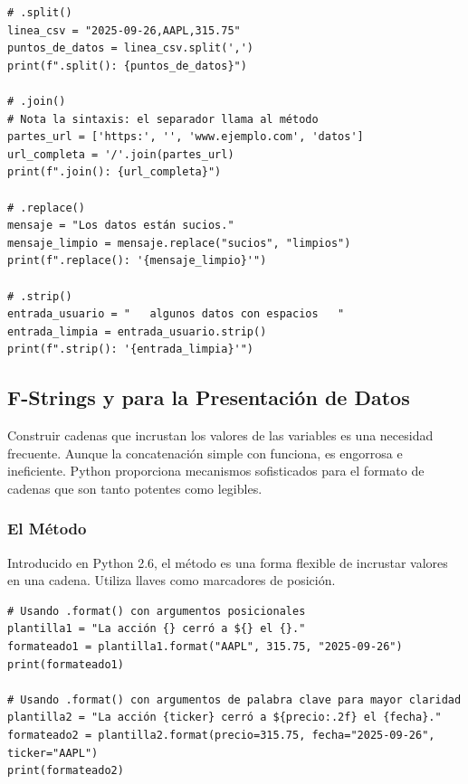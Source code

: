 \begin{example}\text{ }
\text{ }\begin{verbatim}
# .split()
linea_csv = "2025-09-26,AAPL,315.75"
puntos_de_datos = linea_csv.split(',')
print(f".split(): {puntos_de_datos}")

# .join()
# Nota la sintaxis: el separador llama al método
partes_url = ['https:', '', 'www.ejemplo.com', 'datos']
url_completa = '/'.join(partes_url)
print(f".join(): {url_completa}")

# .replace()
mensaje = "Los datos están sucios."
mensaje_limpio = mensaje.replace("sucios", "limpios")
print(f".replace(): '{mensaje_limpio}'")

# .strip()
entrada_usuario = "   algunos datos con espacios   "
entrada_limpia = entrada_usuario.strip()
print(f".strip(): '{entrada_limpia}'")
\end{verbatim}
\end{example}

\subsection{F-Strings y  para la Presentación de Datos}
\label{subsec:string_formatting}
Construir cadenas que incrustan los valores de las variables es una necesidad frecuente. Aunque la concatenación simple con \code{+} funciona, es engorrosa e ineficiente. Python proporciona mecanismos sofisticados para el formato de cadenas que son tanto potentes como legibles.

\subsubsection*{El Método }
Introducido en Python 2.6, el método  es una forma flexible de incrustar valores en una cadena. Utiliza llaves \code{\{\}} como marcadores de posición.

\text{ }\begin{verbatim}
# Usando .format() con argumentos posicionales
plantilla1 = "La acción {} cerró a ${} el {}."
formateado1 = plantilla1.format("AAPL", 315.75, "2025-09-26")
print(formateado1)

# Usando .format() con argumentos de palabra clave para mayor claridad
plantilla2 = "La acción {ticker} cerró a ${precio:.2f} el {fecha}."
formateado2 = plantilla2.format(precio=315.75, fecha="2025-09-26", ticker="AAPL")
print(formateado2)
\end{verbatim}

